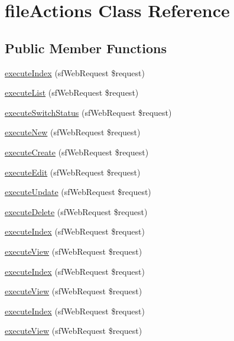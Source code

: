 \hypertarget{classfile_actions}{\section{file\-Actions Class Reference}
\label{classfile_actions}
}
\subsection*{Public Member Functions}
\begin{DoxyCompactItemize}
\item 
\hyperlink{classfile_actions_a948cc911eb1d9f77990be54af3b2080f}{execute\-Index} (sf\-Web\-Request \$request)
\item 
\hyperlink{classfile_actions_a0a9783a06d648bc57d630465f8efa38a}{execute\-List} (sf\-Web\-Request \$request)
\item 
\hyperlink{classfile_actions_a84f3809dd64121e2fd999bf9e0c8b2ba}{execute\-Switch\-Status} (sf\-Web\-Request \$request)
\item 
\hyperlink{classfile_actions_a0ffbea56560c6c633dae68ec22aff21c}{execute\-New} (sf\-Web\-Request \$request)
\item 
\hyperlink{classfile_actions_a75837617743fb64dca82d8133b2c662a}{execute\-Create} (sf\-Web\-Request \$request)
\item 
\hyperlink{classfile_actions_af4d8fedd4b28f3398826a1bb8fa54394}{execute\-Edit} (sf\-Web\-Request \$request)
\item 
\hyperlink{classfile_actions_af7b4f51862add3c2ebb54efc136a0840}{execute\-Update} (sf\-Web\-Request \$request)
\item 
\hyperlink{classfile_actions_a52b5b11b11a0070dd2662257520c045a}{execute\-Delete} (sf\-Web\-Request \$request)
\item 
\hyperlink{classfile_actions_a948cc911eb1d9f77990be54af3b2080f}{execute\-Index} (sf\-Web\-Request \$request)
\item 
\hyperlink{classfile_actions_ad61d212fa3f7e8cb4190700a8a670606}{execute\-View} (sf\-Web\-Request \$request)
\item 
\hyperlink{classfile_actions_a948cc911eb1d9f77990be54af3b2080f}{execute\-Index} (sf\-Web\-Request \$request)
\item 
\hyperlink{classfile_actions_ad61d212fa3f7e8cb4190700a8a670606}{execute\-View} (sf\-Web\-Request \$request)
\item 
\hyperlink{classfile_actions_a948cc911eb1d9f77990be54af3b2080f}{execute\-Index} (sf\-Web\-Request \$request)
\item 
\hyperlink{classfile_actions_ad61d212fa3f7e8cb4190700a8a670606}{execute\-View} (sf\-Web\-Request \$request)
\end{DoxyCompactItemize}
